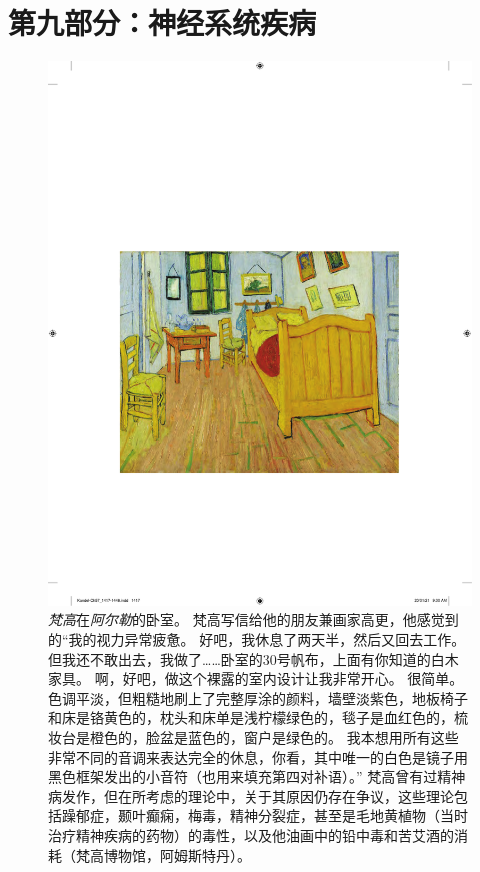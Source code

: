 \chapter*{第九部分：神经系统疾病}

\begin{figure}[htbp]
	\centering
	\includegraphics[width=1.0\linewidth]{chap57/fig_57_0}
	\caption{\textit{梵高}在\textit{阿尔勒}的卧室。
		梵高写信给他的朋友兼画家高更，他感觉到的“我的视力异常疲惫。
		好吧，我休息了两天半，然后又回去工作。
		但我还不敢出去，我做了……卧室的30号帆布，上面有你知道的白木家具。
		啊，好吧，做这个裸露的室内设计让我非常开心。
		很简单。
		色调平淡，但粗糙地刷上了完整厚涂的颜料，墙壁淡紫色，地板椅子和床是铬黄色的，枕头和床单是浅柠檬绿色的，毯子是血红色的，梳妆台是橙色的，脸盆是蓝色的，窗户是绿色的。
		我本想用所有这些非常不同的音调来表达完全的休息，你看，其中唯一的白色是镜子用黑色框架发出的小音符（也用来填充第四对补语）。”
		梵高曾有过精神病发作，但在所考虑的理论中，关于其原因仍存在争议，这些理论包括躁郁症，颞叶癫痫，梅毒，精神分裂症，甚至是毛地黄植物（当时治疗精神疾病的药物）的毒性，以及他油画中的铅中毒和苦艾酒的消耗（梵高博物馆，阿姆斯特丹）。}
	\label{fig:59_0}
\end{figure}


